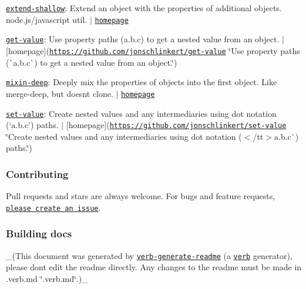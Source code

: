 \begin{DoxyItemize}
\item \href{https://www.npmjs.com/package/extend-shallow}{\tt extend-\/shallow}\+: Extend an object with the properties of additional objects. node.\+js/javascript util. $\vert$ \href{https://github.com/jonschlinkert/extend-shallow}{\tt homepage}
\item \href{https://www.npmjs.com/package/get-value}{\tt get-\/value}\+: Use property paths ({\ttfamily a.\+b.\+c}) to get a nested value from an object. $\vert$ \mbox{[}homepage\mbox{]}(\href{https://github.com/jonschlinkert/get-value}{\tt https\+://github.\+com/jonschlinkert/get-\/value} \char`\"{}\+Use property paths (\`{}a.\+b.\+c\`{}) to get a nested value from an object.\char`\"{})
\item \href{https://www.npmjs.com/package/mixin-deep}{\tt mixin-\/deep}\+: Deeply mix the properties of objects into the first object. Like merge-\/deep, but doesn\textquotesingle{}t clone. $\vert$ \href{https://github.com/jonschlinkert/mixin-deep}{\tt homepage}
\item \href{https://www.npmjs.com/package/set-value}{\tt set-\/value}\+: Create nested values and any intermediaries using dot notation (`\textquotesingle{}a.\+b.\+c'{\ttfamily ) paths. $\vert$ \mbox{[}homepage\mbox{]}(\href{https://github.com/jonschlinkert/set-value}{\tt https\+://github.\+com/jonschlinkert/set-\/value} \char`\"{}\+Create nested values and any intermediaries using dot notation ($<$/tt$>$\textquotesingle{}a.\+b.\+c\textquotesingle{}\`{}) paths.\char`\"{})}
\end{DoxyItemize}

{\ttfamily \subsubsection*{Contributing}}

{\ttfamily }

{\ttfamily Pull requests and stars are always welcome. For bugs and feature requests, \href{../../issues/new}{\tt please create an issue}.}

{\ttfamily \subsubsection*{Building docs}}

{\ttfamily }

{\ttfamily \+\_\+(This document was generated by \href{https://github.com/verbose/verb-generate-readme}{\tt verb-\/generate-\/readme} (a \href{https://github.com/verbose/verb}{\tt verb} generator), please don\textquotesingle{}t edit the readme directly. Any changes to the readme must be made in .verb.\+md \char`\"{}.\+verb.\+md\char`\"{}.)\+\_\+}

